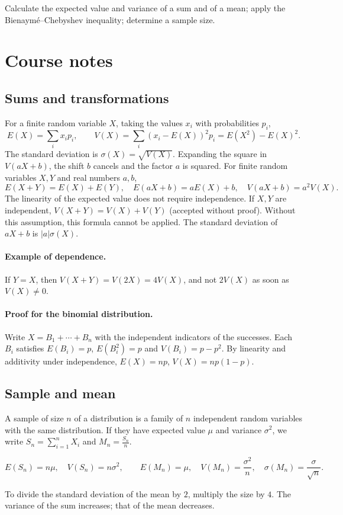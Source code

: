 \label{ch:14}


\begin{keypoint}[Objectives]Calculate the expected value and variance of a sum and of a mean; apply the Bienaymé--Chebyshev inequality; determine a sample size.\end{keypoint}

\section{Course notes}
\subsection{Sums and transformations}
For a finite random variable $X$, taking the values $x_i$ with probabilities $p_i$,
\[E(X)=\sum_i x_ip_i,\qquad V(X)=\sum_i(x_i-E(X))^2p_i=E(X^2)-E(X)^2.\]
The standard deviation is $\sigma(X)=\sqrt{V(X)}$. Expanding the square in $V(aX+b)$, the shift $b$ cancels and the factor $a$ is squared.
For finite random variables $X,Y$ and real numbers $a,b$,
\[E(X+Y)=E(X)+E(Y),\quad E(aX+b)=aE(X)+b,\quad V(aX+b)=a^2V(X).\]
The linearity of the expected value does not require independence. If $X,Y$ are independent, $V(X+Y)=V(X)+V(Y)$ (accepted without proof). Without this assumption, this formula cannot be applied. The standard deviation of $aX+b$ is $|a|\sigma(X)$.
\paragraph{Example of dependence.} If $Y=X$, then $V(X+Y)=V(2X)=4V(X)$, and not $2V(X)$ as soon as $V(X)\ne0$.
\paragraph{Proof for the binomial distribution.} Write $X=B_1+\cdots+B_n$ with the independent indicators of the successes. Each $B_i$ satisfies $E(B_i)=p$, $E(B_i^2)=p$ and $V(B_i)=p-p^2$. By linearity and additivity under independence, $E(X)=np$, $V(X)=np(1-p)$.
\subsection{Sample and mean}
A sample of size $n$ of a distribution is a family of $n$ independent random variables with the same distribution. If they have expected value $\mu$ and variance $\sigma^2$, we write $S_n=\sum_{i=1}^nX_i$ and $M_n=\frac{S_n}{n}$.
\begin{keypoint}
\[E(S_n)=n\mu,\quad V(S_n)=n\sigma^2,\qquad E(M_n)=\mu,\quad V(M_n)=\frac{\sigma^2}{n},\quad\sigma(M_n)=\frac\sigma{\sqrt n}.\]
\end{keypoint}
To divide the standard deviation of the mean by $2$, multiply the size by $4$. The variance of the sum increases; that of the mean decreases.
